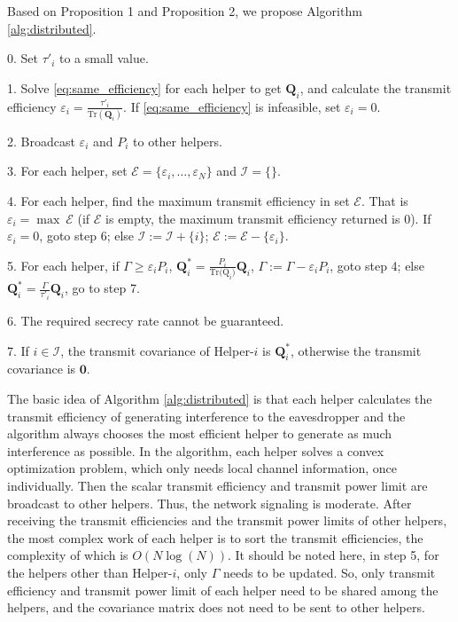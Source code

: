 \documentclass[journal]{IEEEtran}
\begin{document}
Based on Proposition 1 and Proposition 2, we propose Algorithm \ref{alg:distributed}.
\begin{algorithm}
	\caption{}\label{alg:distributed}
	\begin{algorithmic}
		\item[0.] Set $\tau'_i$ to a small value. 
		\item[1.] Solve \eqref{eq:same_efficiency} for each helper to get $\mathbf{Q}_i$, and calculate the transmit efficiency $\varepsilon_i = \frac{\tau'_i}{\mathrm{Tr}(\mathbf{Q}_i)}$.  If \eqref{eq:same_efficiency} is infeasible, set $\varepsilon_i = 0$.
		\item[2.] Broadcast $\varepsilon_i$ and $P_i$ to other helpers. 
		\item[3.] For each helper, set $\mathcal{E} =\{ {\varepsilon_i,\ldots, \varepsilon_N}\}$ and $\mathcal{I} =\{\}$.
		\item[4.] For each helper, find the maximum transmit efficiency in set $\mathcal{E}$. That is $\varepsilon_i = \max~\mathcal{E}$ (if $\mathcal{E}$ is empty,  the maximum transmit efficiency returned is 0). If $\varepsilon_i = 0$, goto step 6; else $\mathcal{I} := \mathcal{I} + \{i\}$; $\mathcal{E} := \mathcal{E}  - \{\varepsilon_i\}$.
		\item[5.] For each helper, if $\Gamma \geq \varepsilon_{i} P_i$, $\mathbf{Q}_{i}^* = \frac{P_i}{\mathrm{Tr(\mathrm{Q}}_i)}\mathbf{Q}_i$, $\Gamma := \Gamma - \varepsilon_iP_i$, goto step 4; else $\mathbf{Q}_{i}^* = \frac{\Gamma}{\tau'_i}\mathbf{Q}_i$, go to step 7.
		\item[6.] The required secrecy rate cannot be guaranteed.
		\item[7.] If $i \in \mathcal{I}$, the transmit covariance of Helper-$i$ is $\mathbf{Q}_i^*$, otherwise the transmit covariance is $\mathbf{0}$.
		
	\end{algorithmic}
\end{algorithm}

The basic idea of Algorithm \ref{alg:distributed} is that each helper calculates the transmit efficiency of generating interference to the eavesdropper and the algorithm always chooses the most efficient helper to generate as much interference as possible. In the algorithm, each helper solves a convex optimization problem, which only needs local channel information,  once individually. Then the scalar transmit efficiency and transmit power limit  are broadcast to other helpers. Thus, the network signaling is moderate. After receiving the transmit efficiencies and the transmit power limits of other helpers, the most complex work of each helper is to sort the transmit efficiencies, the complexity of which is $O(N\log(N))$. It should be noted here, in step 5, for the helpers other than Helper-$i$, only $\Gamma$ needs to be updated. So, only transmit efficiency and transmit power limit of each helper need to be shared among the helpers, and the covariance matrix does not need to be sent to other helpers.
\end{document}
